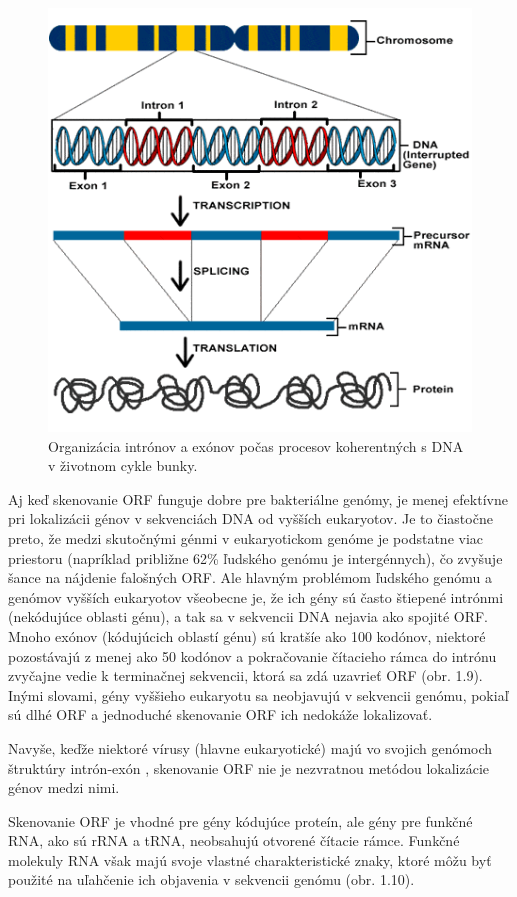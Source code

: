 \begin{figure}[!ht]
	\centering
	\includegraphics[width=.6\textwidth]{figures/eukaryotic_transcription_2.png}
	\caption{Organizácia intrónov a exónov počas procesov koherentných s DNA v životnom cykle bunky.\label{o:latex_friendly_zone}}
\end{figure}
Aj keď skenovanie ORF funguje dobre pre bakteriálne genómy, je menej efektívne pri lokalizácii génov v sekvenciách DNA od vyšších eukaryotov.
Je to čiastočne preto, že medzi skutočnými génmi v eukaryotickom genóme je podstatne viac priestoru (napríklad približne 62\% ľudského genómu je intergénnych), čo zvyšuje šance na nájdenie falošných ORF.
Ale hlavným problémom ľudského genómu a genómov vyšších eukaryotov všeobecne je, že ich gény sú často štiepené intrónmi (nekódujúce oblasti génu), a tak sa v sekvencii DNA nejavia ako spojité ORF.
Mnoho exónov (kódujúcich oblastí génu) sú kratšíe ako 100 kodónov, niektoré pozostávajú z menej ako 50 kodónov a pokračovanie čítacieho rámca do intrónu zvyčajne vedie k terminačnej sekvencii, ktorá sa zdá uzavrieť ORF (obr. 1.9).
Inými slovami, gény vyššieho eukaryotu sa neobjavujú v sekvencii genómu, pokiaľ sú dlhé ORF a jednoduché skenovanie ORF ich nedokáže lokalizovať.

Navyše, keďže niektoré vírusy (hlavne eukaryotické) majú vo svojich genómoch štruktúry intrón-exón \cite{Genes3}, skenovanie ORF nie je nezvratnou metódou lokalizácie génov medzi nimi.

Skenovanie ORF je vhodné pre gény kódujúce proteín, ale gény pre funkčné RNA, ako sú rRNA a tRNA, neobsahujú otvorené čítacie rámce.
Funkčné molekuly RNA však majú svoje vlastné charakteristické znaky, ktoré môžu byť použité na uľahčenie ich objavenia v sekvencii genómu (obr. 1.10).

